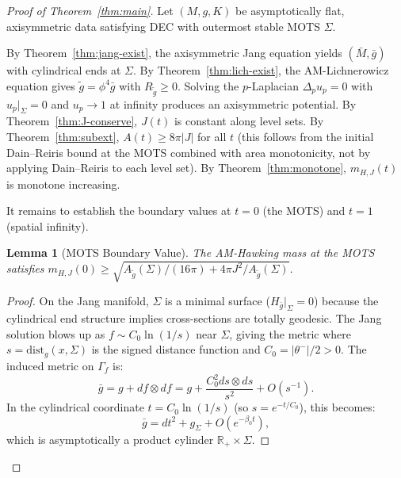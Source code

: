\documentclass[12pt]{article}
\theoremstyle{plain}
\newtheorem{lemma}[theorem]{Lemma}
\theoremstyle{definition}
\theoremstyle{remark}
\newcommand{\tg}{\tilde{g}}
\newcommand{\bg}{\bar{g}}
\newcommand{\bM}{\bar{M}}
\begin{document}
\begin{proof}[Proof of Theorem~\ref{thm:main}]
Let $(M, g, K)$ be asymptotically flat, axisymmetric data satisfying DEC with outermost stable MOTS $\Sigma$.

By Theorem~\ref{thm:jang-exist}, the axisymmetric Jang equation yields $(\bM, \bg)$ with cylindrical ends at $\Sigma$. By Theorem~\ref{thm:lich-exist}, the AM-Lichnerowicz equation gives $\tg = \phi^4 \bg$ with $R_{\tg} \geq 0$. Solving the $p$-Laplacian $\Delta_p u_p = 0$ with $u_p|_\Sigma = 0$ and $u_p \to 1$ at infinity produces an axisymmetric potential. By Theorem~\ref{thm:J-conserve}, $J(t)$ is constant along level sets. By Theorem~\ref{thm:subext}, $A(t) \geq 8\pi|J|$ for all $t$ (this follows from the initial Dain--Reiris bound at the MOTS combined with area monotonicity, not by applying Dain--Reiris to each level set). By Theorem~\ref{thm:monotone}, $m_{H,J}(t)$ is monotone increasing.

It remains to establish the boundary values at $t = 0$ (the MOTS) and $t = 1$ (spatial infinity).

\begin{lemma}[MOTS Boundary Value]\label{lem:mots-boundary}
The AM-Hawking mass at the MOTS satisfies $m_{H,J}(0) \geq \sqrt{A_{\tg}(\Sigma)/(16\pi) + 4\pi J^2/A_{\tg}(\Sigma)}$.
\end{lemma}

\begin{proof}
On the Jang manifold, $\Sigma$ is a minimal surface ($H_{\bg}|_\Sigma = 0$) because the cylindrical end structure implies cross-sections are totally geodesic. The Jang solution blows up as $f \sim C_0 \ln(1/s)$ near $\Sigma$, giving the metric
where $s = \mathrm{dist}_g(x, \Sigma)$ is the signed distance function and $C_0 = |\theta^-|/2 > 0$. The induced metric on $\Gamma_f$ is:
\[
\bg = g + df \otimes df = g + \frac{C_0^2 ds \otimes ds}{s^2} + O(s^{-1}).
\]
In the cylindrical coordinate $t = C_0\ln(1/s)$ (so $s = e^{-t/C_0}$), this becomes:
\[
\bg = dt^2 + g_\Sigma + O(e^{-\beta_0 t}),
\]
which is asymptotically a product cylinder $\mathbb{R}_+ \times \Sigma$.


\end{proof}
\end{proof}
\end{document}
